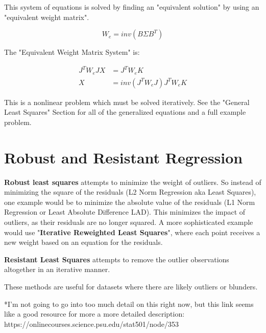 This system of equations is solved by finding an "equivalent solution" by using an "equivalent weight matrix".

\[
W_e = inv(B \Sigma B^T)
\]

The "Equivalent Weight Matrix System" is:

\begin{align*}
J^TW_eJX &= J^TW_eK \\
X &= inv(J^TW_eJ)J^TW_eK 
\end{align*}

This is a nonlinear problem which must be solved iteratively.  See the "General Least Squares" Section for all of the generalized equations and a full example problem.

\section{Robust and Resistant Regression}
\textbf{Robust least squares} attempts to minimize the weight of outliers.  So instead of minimizing the square of the residuals (L2 Norm Regression aka Least Squares), one example would be to minimize the absolute value of the residuals (L1 Norm Regression or Least Absolute Difference LAD).  This minimizes the impact of outliers, as their residuals are no longer squared.  A more sophisticated example would use "\textbf{Iterative Reweighted Least Squares}", where each point receives a new weight based on an equation for the residuals.
\vspace{0.5cm}

\noindent
\textbf{Resistant Least Squares} attempts to remove the outlier observations altogether in an iterative manner.  

\vspace{0.5cm}
\noindent
These methods are useful for datasets where there are likely outliers or blunders.

\vspace{0.5cm}
\noindent
*I'm not going to go into too much detail on this right now, but this link seems like a good resource for more a more detailed description: https://onlinecourses.science.psu.edu/stat501/node/353
